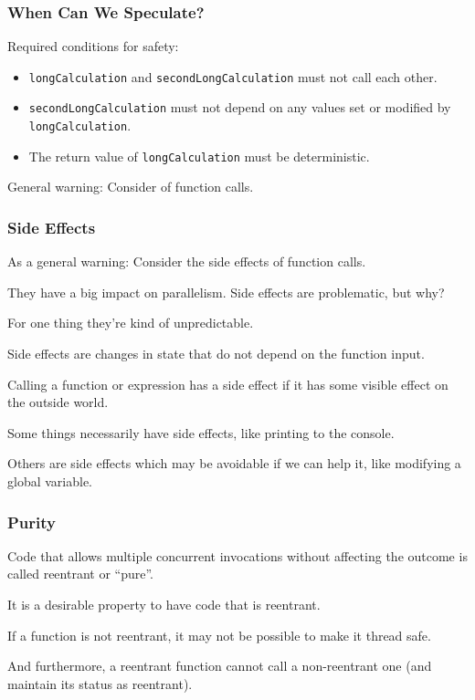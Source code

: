 \begin{frame}
  \frametitle{When Can We Speculate?}

  
  Required conditions for safety:

  \begin{itemize}
    \item {\tt longCalculation} and {\tt secondLongCalculation} must not call
      each other.
    \item {\tt secondLongCalculation} must not depend on
      any values set or modified by {\tt longCalculation}.
    \item The return value of {\tt longCalculation} must be deterministic.
  \end{itemize}

  General warning: Consider  of function calls.
  
\end{frame}



\begin{frame}
\frametitle{Side Effects}

As a general warning: Consider the \alert{side effects} of function calls. 

They have a big impact on parallelism. Side effects are problematic, but why? 

For one thing they're kind of unpredictable. 

Side effects are changes in state that do not depend on the function input. 

Calling a function or expression has a side effect if it has some visible effect on the outside world. 

Some things necessarily have side effects, like printing to the console. 

Others are side effects which may be avoidable if we can help it, like modifying a global variable.

\end{frame}



\begin{frame}
\frametitle{Purity}

Code that allows multiple concurrent invocations without affecting the outcome is called reentrant or ``pure''. 

It is a desirable property to have code that is reentrant. 

If a function is not reentrant, it may not be possible to make it thread safe. 

And furthermore, a reentrant function cannot call a non-reentrant one (and maintain its status as reentrant).

\end{frame}



